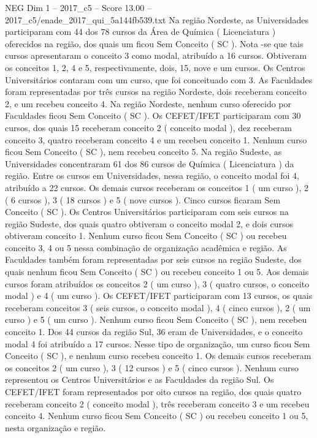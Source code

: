 \begin{textsample}{NEG Dim 1 – 2017\_c5 – Score 13.00 – 2017\_c5/enade\_2017\_qui\_5a144fb539.txt}
Na região Nordeste, as Universidades participaram com 44 dos 78 cursos da Área de Química ( Licenciatura ) oferecidos na região, dos quais um ficou Sem Conceito ( SC ).
Nota -se que tais cursos apresentaram o conceito 3 como modal, atribuído a 16 cursos.
Obtiveram os conceitos 1, 2, 4 e 5, respectivamente, dois, 15, nove e um cursos.
Os Centros Universitários contaram com um curso, que foi conceituado com 3.
As Faculdades foram representadas por três cursos na região Nordeste, dois receberam conceito 2, e um recebeu conceito 4.
Na região Nordeste, nenhum curso oferecido por Faculdades ficou Sem Conceito ( SC ).
Os CEFET/IFET participaram com 30 cursos, dos quais 15 receberam conceito 2 ( conceito modal ), dez receberam conceito 3, quatro receberam conceito 4 e um recebeu conceito 1.
Nenhum curso ficou Sem Conceito ( SC ), nem recebeu conceito 5.
Na região Sudeste, as Universidades concentraram 61 dos 86 cursos de Química ( Licenciatura ) da região.
Entre os cursos em Universidades, nessa região, o conceito modal foi 4, atribuído a 22 cursos.
Os demais cursos receberam os conceitos 1 ( um curso ), 2 ( 6 cursos ), 3 ( 18 cursos ) e 5 ( nove cursos ).
Cinco cursos ficaram Sem Conceito ( SC ).
Os Centros Universitários participaram com seis cursos na região Sudeste, dos quais quatro obtiveram o conceito modal 2, e dois cursos obtiveram conceito 1.
Nenhum curso ficou Sem Conceito ( SC ) ou recebeu conceito 3, 4 ou 5 nessa combinação de organização acadêmica e região.
As Faculdades também foram representadas por seis cursos na região Sudeste, dos quais nenhum ficou Sem Conceito ( SC ) ou recebeu conceito 1 ou 5.
Aos demais cursos foram atribuídos os conceitos 2 ( um curso ), 3 ( quatro cursos, o conceito modal ) e 4 ( um curso ).
Os CEFET/IFET participaram com 13 cursos, os quais receberam conceitos 3 ( seis cursos, o conceito modal ), 4 ( cinco cursos ), 2 ( um curso ) e 5 ( um curso ).
Nenhum curso ficou Sem Conceito ( SC ), nem recebeu conceito 1.
Dos 44 cursos da região Sul, 36 eram de Universidades, e o conceito modal 4 foi atribuído a 17 cursos.
Nesse tipo de organização, um curso ficou Sem Conceito ( SC ), e nenhum curso recebeu conceito 1.
Os demais cursos receberam os conceitos 2 ( um curso ), 3 ( 12 cursos ) e 5 ( cinco cursos ).
Nenhum curso representou os Centros Universitários e as Faculdades da região Sul.
Os CEFET/IFET foram representados por oito cursos na região, dos quais quatro receberam conceito 2 ( conceito modal ), três receberam conceito 3 e um recebeu conceito 4.
Nenhum curso ficou Sem Conceito ( SC ) ou recebeu conceito 1 ou 5, nesta organização e região.

\end{textsample}
